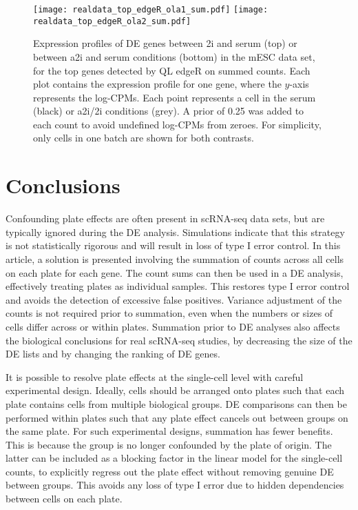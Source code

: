 \documentclass{article}
\begin{document}
\begin{figure}[bt]
    \begin{center}
        \texttt{[image: realdata\_top\_edgeR\_ola1\_sum.pdf]}
        \texttt{[image: realdata\_top\_edgeR\_ola2\_sum.pdf]}
    \end{center}
\caption{
    Expression profiles of DE genes between 2i and serum (top) or between a2i and serum conditions (bottom) in the mESC data set, 
        for the top genes detected by QL edgeR on summed counts.
    Each plot contains the expression profile for one gene, where the $y$-axis represents the log-CPMs.
    Each point represents a cell in the serum (black) or a2i/2i conditions (grey).
    A prior of 0.25 was added to each count to avoid undefined log-CPMs from zeroes.
    For simplicity, only cells in one batch are shown for both contrasts.
}
\label{fig:realdata}
\end{figure}


\section{Conclusions}
Confounding plate effects are often present in scRNA-seq data sets, but are typically ignored during the DE analysis.
Simulations indicate that this strategy is not statistically rigorous and will result in loss of type I error control. 
In this article, a solution is presented involving the summation of counts across all cells on each plate for each gene.
The count sums can then be used in a DE analysis, effectively treating plates as individual samples.
This restores type I error control and avoids the detection of excessive false positives.
Variance adjustment of the counts is not required prior to summation, even when the numbers or sizes of cells differ across or within plates.
Summation prior to DE analyses also affects the biological conclusions for real scRNA-seq studies, 
    by decreasing the size of the DE lists and by changing the ranking of DE genes.

It is possible to resolve plate effects at the single-cell level with careful experimental design.
Ideally, cells should be arranged onto plates such that each plate contains cells from multiple biological groups.
DE comparisons can then be performed within plates such that any plate effect cancels out between groups on the same plate.
For such experimental designs, summation has fewer benefits.
This is because the group is no longer confounded by the plate of origin.
The latter can be included as a blocking factor in the linear model for the single-cell counts, 
    to explicitly regress out the plate effect without removing genuine DE between groups.
This avoids any loss of type I error due to hidden dependencies between cells on each plate.
\end{document}

